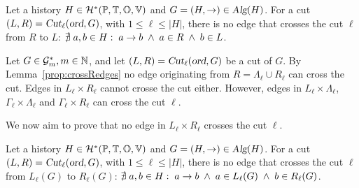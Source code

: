 \begin{lemma}\label{prop:crossRedges}
Let a history $H\in\mathcal{H}^*(\mathbb{P}, \mathbb{T}, \mathbb{O}, \mathbb{V})$ and $G=(H,\rightarrow)\in\textsl{Alg}(H)$. For a cut 
\mbox{$(L,R)=\textsl{Cut}_\ell(\textsl{ord},G)$}, with \mbox{$1\leq\ell\leq|H|$}, there is no edge that crosses the cut $\ell$ from $R$ to $L$: $\nexists\; a,b\in H:\; a\rightarrow b\;\land\;a\in R\;\land\;b\in L$.
\end{lemma}

Let $G\in\mathcal{G}^*_m,m\in\mathbb{N}$, and let \mbox{$(L,R)=\textsl{Cut}_\ell(\textsl{ord},G)$} be a cut of $G$.
By Lemma~\ref{prop:crossRedges} no edge originating from $R=\Lambda_\ell \cup R_\ell$ can cross the cut. Edges in $L_\ell\times R_\ell$ cannot crosse the cut either. However, edges in $L_\ell\times\Lambda_\ell$, $\Gamma_\ell\times\Lambda_\ell$ and $\Gamma_\ell\times R_\ell$ can cross the cut $\ell$. 

We now aim to prove that no edge in $L_\ell\times R_\ell$ crosses the cut $\ell$.

\begin{lemma}\label{lemma:noCrossingLlRl}
Let a history $H\in\mathcal{H}^*(\mathbb{P}, \mathbb{T}, \mathbb{O}, \mathbb{V})$ and $G=(H,\rightarrow)\in\textsl{Alg}(H)$. For a cut 
\mbox{$(L,R)=\textsl{Cut}_\ell(\textsl{ord},G)$}, with \mbox{$1\leq\ell\leq|H|$}, there is no edge that crosses the cut $\ell$ from $L_\ell(G)$ to $R_\ell(G)$: $\nexists\; a,b\in H:\; a\rightarrow b\;\land\;a\in L_\ell(G)\;\land\;b\in R_\ell(G)$.
\end{lemma}

